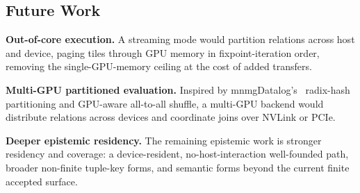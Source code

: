\subsection{Future Work}

\textbf{Out-of-core execution.} A streaming mode would partition relations across host and device, paging tiles through GPU memory in fixpoint-iteration order, removing the single-GPU-memory ceiling at the cost of added transfers.

\textbf{Multi-GPU partitioned evaluation.} Inspired by mnmgDatalog's~\cite{mnmgdatalog} radix-hash partitioning and GPU-aware all-to-all shuffle, a multi-GPU backend would distribute relations across devices and coordinate joins over NVLink or PCIe.

\textbf{Deeper epistemic residency.} The remaining epistemic work is stronger residency and coverage: a device-resident, no-host-interaction well-founded path, broader non-finite tuple-key forms, and semantic forms beyond the current finite accepted surface.
